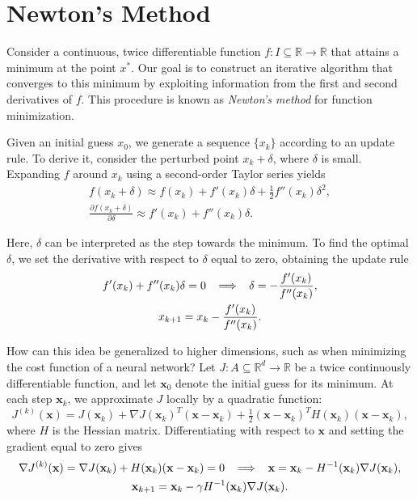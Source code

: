 \documentclass{article}
\numberwithin{equation}{subsection}
\begin{document}
\section{Newton’s Method}
Consider a continuous, twice differentiable function $f : I \subseteq \mathbb{R} \to \mathbb{R}$ that attains a minimum at the point $x^*$. Our goal is to construct an iterative algorithm that converges to this minimum by exploiting information from the first and second derivatives of $f$. This procedure is known as \emph{Newton’s method} for function minimization.  

Given an initial guess $x_0$, we generate a sequence $\{x_k\}$ according to an update rule. To derive it, consider the perturbed point $x_k + \delta$, where $\delta$ is small. Expanding $f$ around $x_k$ using a second-order Taylor series yields
\begin{gather*}
    f(x_k + \delta) \approx f(x_k) + f'(x_k)\delta + \tfrac{1}{2} f''(x_k)\delta^2, \\
    \frac{\partial f(x_k+\delta)}{\partial \delta} \approx f'(x_k) + f''(x_k)\delta.
\end{gather*}

Here, $\delta$ can be interpreted as the step towards the minimum. To find the optimal $\delta$, we set the derivative with respect to $\delta$ equal to zero, obtaining the update rule
\begin{gather}
    f'(x_k) + f''(x_k)\delta = 0 
    \;\;\implies\;\; 
    \delta = -\frac{f'(x_k)}{f''(x_k)}, \notag \\
    x_{k+1} = x_k - \frac{f'(x_k)}{f''(x_k)}.
\end{gather}

How can this idea be generalized to higher dimensions, such as when minimizing the cost function of a neural network? Let $J : A \subseteq \mathbb{R}^d \to \mathbb{R}$ be a twice continuously differentiable function, and let $\mathbf{x}_0$ denote the initial guess for its minimum. At each step $\mathbf{x}_k$, we approximate $J$ locally by a quadratic function:
\begin{equation*}
    J^{(k)}(\mathbf{x}) = J(\mathbf{x}_k) 
    + \nabla J(\mathbf{x}_k)^T (\mathbf{x} - \mathbf{x}_k) 
    + \tfrac{1}{2} (\mathbf{x} - \mathbf{x}_k)^T H(\mathbf{x}_k)(\mathbf{x} - \mathbf{x}_k),
\end{equation*}
where $H$ is the Hessian matrix. Differentiating with respect to $\mathbf{x}$ and setting the gradient equal to zero gives
\begin{gather}
    \nabla J^{(k)}(\mathbf{x}) 
    = \nabla J(\mathbf{x}_k) + H(\mathbf{x}_k)(\mathbf{x} - \mathbf{x}_k) = 0 \notag \;\; \implies\;\; \mathbf{x} = \mathbf{x}_k - H^{-1}(\mathbf{x}_k)\nabla J(\mathbf{x}_k), \\
    \mathbf{x}_{k+1} = \mathbf{x}_k - \gamma H^{-1}(\mathbf{x}_k)\nabla J(\mathbf{x}_k). \notag
\end{gather}
\end{document}
